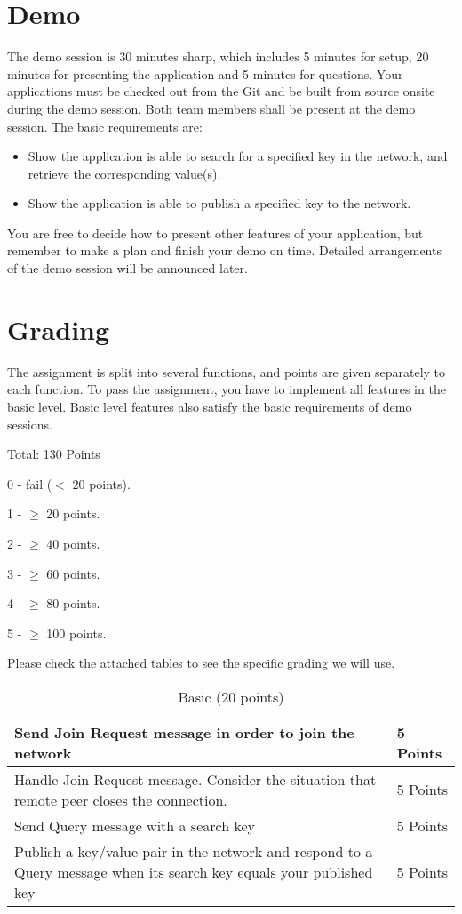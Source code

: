 \documentclass[12pt, a4paper]{article}
\begin{document}
\section{Demo}
The demo session is 30 minutes sharp, which includes 5 minutes for setup, 20 minutes for presenting the application and 5 minutes for questions.
Your applications must be checked out from the Git and be built from source onsite during the demo session.
Both team members shall be present at the demo session.
The basic requirements are:
\begin{itemize}
\item Show the application is able to search for a specified key in the network, and retrieve the corresponding value(s).
\item Show the application is able to publish a specified key to the network.
\end{itemize}
You are free to decide how to present other features of your application, but remember to make a plan and finish your demo on time.
Detailed arrangements of the demo session will be announced later.

\section{Grading}
The assignment is split into several functions, and points are given separately to each function.
To pass the assignment, you have to implement all features in the basic level.
Basic level features also satisfy the basic requirements of demo sessions.

Total: 130 Points

0 - fail ($<$ 20 points).

1 - $\ge$ 20 points.

2 - $\ge$  40 points.

3 - $\ge$ 60 points.

4 - $\ge$ 80 points.

5 - $\ge$  100 points.

Please check the attached tables to see the specific grading we will use.

\begin{table}[htdp]
\caption{Basic (20 points)}
\begin{center}
\begin{tabular}{|p{12cm}|p{2cm}|}
\hline
Send Join Request message in order to join the network & 5 Points \\
\hline
Handle Join Request message. Consider the situation that remote peer closes the connection. & 5 Points\\
\hline
Send Query message with a search key & 5 Points  \\
\hline
Publish a key/value pair in the network and respond to a Query message when its search key equals your published key & 5 Points \\
\hline
\end{tabular}
\end{center}
\end{table}
\end{document}
